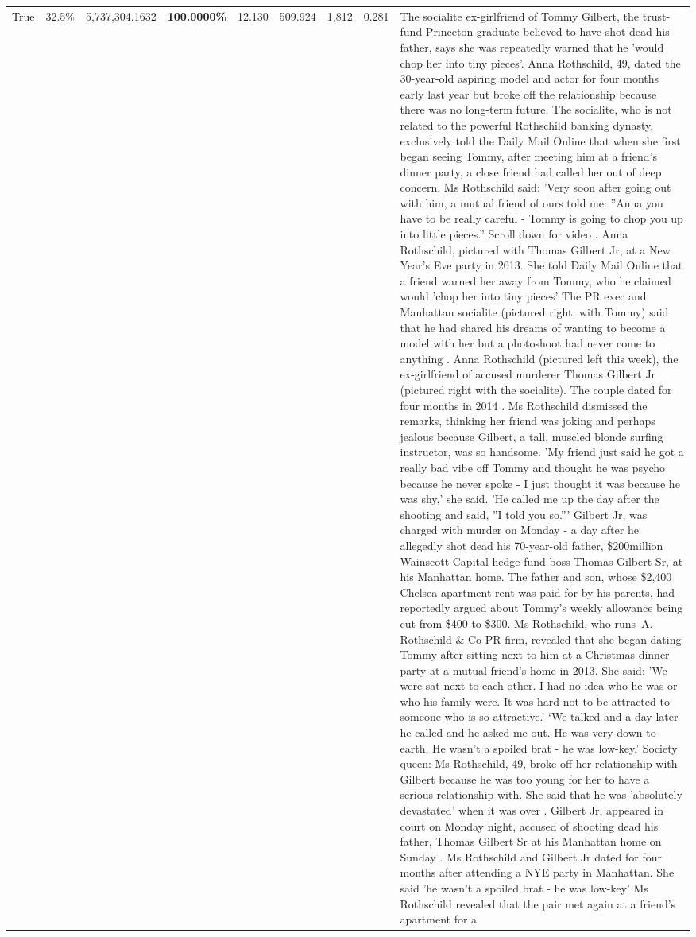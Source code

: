 \begin{table}[H]
\begin{tabular}{lllrlllll}
True & 32.5\% & 5,737,304.1632 & \bfseries \color{red} 100.0000\% & 12.130 & 509.924 & 1,812 & 0.281 & The socialite ex-girlfriend of Tommy Gilbert, the trust-fund Princeton graduate believed to have shot dead his father, says she was repeatedly warned that he 'would chop her into tiny pieces'. Anna Rothschild, 49, dated the 30-year-old aspiring model and actor for four months early last year but broke off the relationship because there was no long-term future. The socialite, who is not related to the powerful Rothschild banking dynasty, exclusively told the Daily Mail Online that when she first began seeing Tommy, after meeting him at a friend's dinner party, a close friend had called her out of deep concern. Ms Rothschild said: 'Very soon after going out with him, a mutual friend of ours told me: ''Anna you have to be really careful - Tommy is going to chop you up into little pieces.'' Scroll down for video . Anna Rothschild, pictured with Thomas Gilbert Jr, at a New Year's Eve party in 2013. She told Daily Mail Online that a friend warned her away from Tommy, who he claimed would 'chop her into tiny pieces' The PR exec and Manhattan socialite (pictured right, with Tommy) said that he had shared his dreams of wanting to become a model with her but a photoshoot had never come to anything . Anna Rothschild (pictured left this week), the ex-girlfriend of accused murderer Thomas Gilbert Jr (pictured right with the socialite). The couple dated for four months in 2014 . Ms Rothschild dismissed the remarks, thinking her friend was joking and perhaps jealous because Gilbert, a tall, muscled blonde surfing instructor, was so handsome. 'My friend just said he got a really bad vibe off Tommy and thought he was psycho because he never spoke - I just thought it was because he was shy,' she said. 'He called me up the day after the shooting and said, ''I told you so.''' Gilbert Jr, was charged with murder on Monday - a day after he allegedly shot dead his 70-year-old father, \$200million Wainscott Capital hedge-fund boss Thomas Gilbert Sr, at his Manhattan home. The father and son, whose \$2,400 Chelsea apartment rent was paid for by his parents, had reportedly argued about Tommy's weekly allowance being cut from \$400 to \$300. Ms Rothschild, who runs A. Rothschild \& Co PR firm, revealed that she began dating Tommy after sitting next to him at a Christmas dinner party at a mutual friend's home in 2013. She said: 'We were sat next to each other. I had no idea who he was or who his family were. It was hard not to be attracted to someone who is so attractive.' ‘We talked and a day later he called and he asked me out. He was very down-to-earth. He wasn’t a spoiled brat - he was low-key.’ Society queen: Ms Rothschild, 49, broke off her relationship with Gilbert because he was too young for her to have a serious relationship with. She said that he was 'absolutely devastated' when it was over . Gilbert Jr, appeared in court on Monday night, accused of shooting dead his father, Thomas Gilbert Sr at his Manhattan home on Sunday . Ms Rothschild and Gilbert Jr dated for four months after attending a NYE party in Manhattan. She said 'he wasn't a spoiled brat - he was low-key' Ms Rothschild revealed that the pair met again at a friend’s apartment for a 
\end{tabular}
\end{table}
